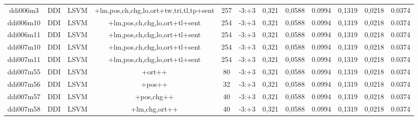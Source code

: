 \documentclass[a4paper]{article}
\begin{document}
\begin{landscape}
\begin{center}
\begin{tabular}{ |c|c|c|c|c|c|c|c|c|c|c|c|}
 	
 
 	
 		
 		\small{ ddi006m3 } & DDI & LSVM & +lm,pos,ch,chg,lo,ort+tw,tri,tl,tp+sent  &  257 &  -3:+3  &  0,321 & 0,0588 & 0.0994  &  0,1319 & 0,0218 & 0.0374 \\
 		

 	
 
 	
 		
 		\small{ ddi006m10 } & DDI & LSVM & +lm,pos,ch,chg,lo,ort+tl+sent  &  254 &  -3:+3  &  0,321 & 0,0588 & 0.0994  &  0,1319 & 0,0218 & 0.0374 \\
 		

 	
 
 	
 		
 		\small{ ddi006m11 } & DDI & LSVM & +lm,pos,ch,chg,lo,ort+tl+sent  &  254 &  -3:+3  &  0,321 & 0,0588 & 0.0994  &  0,1319 & 0,0218 & 0.0374 \\
 		

 	
 
 	
 		
 		\small{ ddi007m10 } & DDI & LSVM & +lm,pos,ch,chg,lo,ort+tl+sent  &  254 &  -3:+3  &  0,321 & 0,0588 & 0.0994  &  0,1319 & 0,0218 & 0.0374 \\
 		

 	
 
 	
 		
 		\small{ ddi007m11 } & DDI & LSVM & +lm,pos,ch,chg,lo,ort+tl+sent  &  254 &  -3:+3  &  0,321 & 0,0588 & 0.0994  &  0,1319 & 0,0218 & 0.0374 \\
 		

 	
 
 	
 		
 		\small{ ddi007m55 } & DDI & LSVM & +ort++  &  80 &  -3:+3  &  0,321 & 0,0588 & 0.0994  &  0,1319 & 0,0218 & 0.0374 \\
 		

 	
 
 	
 		
 		\small{ ddi007m56 } & DDI & LSVM & +pos++  &  32 &  -3:+3  &  0,321 & 0,0588 & 0.0994  &  0,1319 & 0,0218 & 0.0374 \\
 		

 	
 
 	
 		
 		\small{ ddi007m57 } & DDI & LSVM & +pos,chg++  &  40 &  -3:+3  &  0,321 & 0,0588 & 0.0994  &  0,1319 & 0,0218 & 0.0374 \\
 		

 	
 
 	
 		
 		\small{ ddi007m58 } & DDI & LSVM & +lm,chg,ort++  &  40 &  -3:+3  &  0,321 & 0,0588 & 0.0994  &  0,1319 & 0,0218 & 0.0374 \\
 		


\end{tabular}
\end{center}
\end{landscape}
\end{document}
